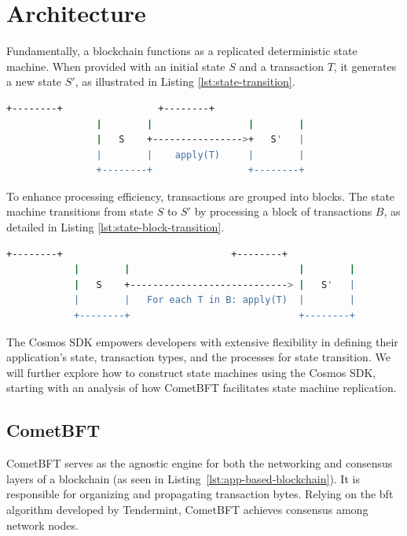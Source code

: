 \section{Architecture}

Fundamentally, a blockchain functions as a replicated deterministic state machine. When provided with an initial state \(S\) and a transaction \(T\), it generates a new state \(S'\), as illustrated in Listing \ref{lst:state-transition}.

\begin{lstlisting}[language=bash, caption=State machine transition. Source:\cite{app-based-blockchain},label={lst:state-transition}]
                +--------+                 +--------+
                |        |                 |        |
                |   S    +---------------->+   S'   |
                |        |    apply(T)     |        |
                +--------+                 +--------+
\end{lstlisting}

To enhance processing efficiency, transactions are grouped into blocks. The state machine transitions from state \(S\) to \(S'\) by processing a block of transactions \(B\), as detailed in Listing \ref{lst:state-block-transition}.

\begin{lstlisting}[language=bash, caption=Block of bundled transactions. Source:\cite{app-based-blockchain},label={lst:state-block-transition}]
            +--------+                              +--------+
            |        |                              |        |
            |   S    +----------------------------> |   S'   |
            |        |   For each T in B: apply(T)  |        |
            +--------+                              +--------+
\end{lstlisting}

The Cosmos SDK empowers developers with extensive flexibility in defining their application's state, transaction types, and the processes for state transition. We will further explore how to construct state machines using the Cosmos SDK, starting with an analysis of how CometBFT facilitates state machine replication.

\subsection{CometBFT}

CometBFT serves as the agnostic engine for both the networking and consensus layers of a blockchain (as seen in Listing~\ref{lst:app-based-blockchain}). It is responsible for organizing and propagating transaction bytes. Relying on the \gls{bft} algorithm developed by Tendermint, CometBFT achieves consensus among network nodes.

